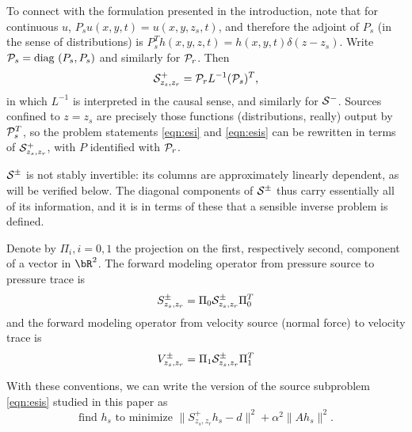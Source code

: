  To connect with the formulation presented in
the introduction, note that for continuous $u$,
$P_su(x,y,t)=u(x,y,z_s,t)$, and therefore the adjoint of $P_s$ (in the
sense of distributions) is $P_s^Th(x,y,z,t) =
h(x,y,t)\delta(z-z_s)$. Write ${\cal P}_s = \mbox{diag }(P_s,P_s)$ and
similarly for ${\cal P}_r$. Then
\[
  {\cal S}^{+}_{z_s,z_r} = {\cal P}_r L^{-1}({\cal P}_s)^T,
\]
in which $L^{-1}$ is interpreted in the causal sense, and similarly
for ${\cal S}^{-}$. Sources confined to $z=z_s$ are precisely those
functions (distributions, really) output by ${\cal P}_s^T$, so the
problem statements \ref{eqn:esi} and \ref{eqn:esis} can be rewritten
in terms of ${\cal S}^+_{z_s,z_r}$, with $P$ identified with ${\cal P}_r$.

${\cal S}^{\pm}$ is not stably invertible: its columns are
approximately linearly dependent, as will be verified below. The
diagonal components of ${\cal S}^{\pm}$ thus carry essentially all of
its information, and it is in terms of these that a sensible inverse problem
is defined.

Denote by $\Pi_i, i=0,1$ the projection on the first,
respectively second, component of a vector in $\bR^2$. The 
forward modeling operator from pressure source to pressure trace is
\begin{equation}
  \label{eqn:sdef}
  S^{\pm}_{z_s,z_r} = \Pi_0 {\cal S}^{\pm}_{z_s,z_r} \Pi_0^T 
\end{equation}
and the forward modeling operator from velocity source (normal force)
to velocity trace is
\begin{equation}
  \label{eqn:vdef}
  V^{\pm}_{z_s,z_r} = \Pi_1 {\cal S}^{\pm}_{z_s,z_r} \Pi_1^T 
\end{equation}

With these conventions, we can write the version of the source
subproblem \ref{eqn:esis} studied in this paper as
\begin{equation}
  \label{eqn:esisp}
  \mbox{find }h_s\mbox{ to minimize }\|S^{+}_{z_s,z_r}h_s- d\|^2 +
  \alpha^2\|Ah_s\|^2.
\end{equation}



